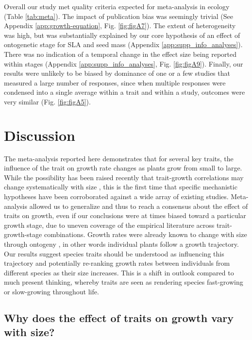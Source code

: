 \documentclass[a4paper,11pt]{article}
\begin{document}
Overall our study met quality criteria expected for meta-analysis in ecology (Table \ref{tab:meta}). The impact of publication bias was seemingly trivial (See Appendix \ref{app:growth-equation}, Fig. \ref{fig:figA7}). The extent of heterogeneity was high, but was substantially explained by our core hypothesis of an effect of ontogenetic stage for SLA and seed mass (Appendix \ref{app:supp_info_analyses}). There was no indication of a temporal change in the effect size being reported within stages (Appendix \ref{app:supp_info_analyses}, Fig. \ref{fig:figA9}). Finally, our results were unlikely to be biased by dominance of one or a few studies that measured a large number of responses, since when multiple responses were condensed into a single average within a trait and within a study, outcomes were very similar (Fig. \ref{fig:figA5}).


\section*{Discussion}\label{discussion}

The meta-analysis reported here demonstrates that for several key traits, the influence of the trait on growth rate changes as plants grow from small to large. While the possibility has been raised recently that trait-growth correlations may change systematically with size \citep{Falster:2011ii, Ruger:2012jv, Iida:2014ep, Iida:2014hq}, this is the first time that specific mechanistic hypotheses have been corroborated against a wide array of existing studies. Meta-analysis allowed us to generalize and thus to reach a consensus about the effect of traits on growth, even if our conclusions were at times biased toward a particular growth stage, due to uneven coverage of the empirical literature across trait-growth-stage combinations. Growth rates were already known to change with size through ontogeny \citep{Condit:1993hd, Clark:1999ed, Herault:2011dd}, in other words individual plants follow a growth trajectory. Our results suggest species traits should be understood as influencing this trajectory and potentially re-ranking growth rates between individuals from different species as their size increases. This is a shift in outlook compared to much present thinking, whereby traits are seen as rendering species fast-growing or slow-growing throughout life.

\subsection*{Why does the effect of traits on growth vary with size?}
\end{document}
